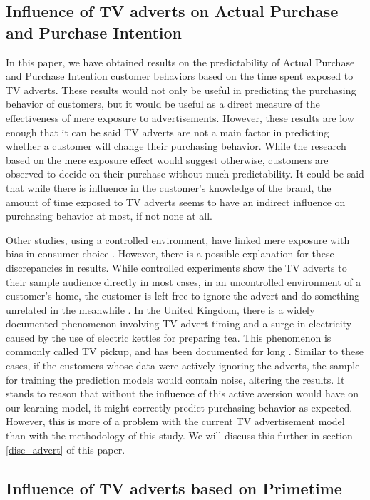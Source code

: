 \documentclass[review]{elsarticle}
\begin{document}
\subsection{Influence of TV adverts on Actual Purchase and Purchase Intention}
\label{disc_ap_pi}

In this paper, we have obtained results on the predictability of Actual Purchase and Purchase Intention customer behaviors based on the time spent exposed to TV adverts. These results would not only be useful in predicting the purchasing behavior of customers, but it would be useful as a direct measure of the effectiveness of mere exposure to advertisements. However, these results are low enough that it can be said TV adverts are not a main factor in predicting whether a customer will change their purchasing behavior. While the research based on the mere exposure effect would suggest otherwise, customers are observed to decide on their purchase without much predictability. It could be said that while there is influence in the customer's knowledge of the brand, the amount of time exposed to TV adverts seems to have an indirect influence on purchasing behavior at most, if not none at all.

Other studies, using a controlled environment, have linked mere exposure with bias in consumer choice \cite{37}. However, there is a possible explanation for these discrepancies in results. While controlled experiments show the TV adverts to their sample audience directly in most cases, in an uncontrolled environment of a customer's home, the customer is left free to ignore the advert and do something unrelated in the meanwhile \cite{38}. In the United Kingdom, there is a widely documented phenomenon involving TV advert timing and a surge in electricity caused by the use of electric kettles for preparing tea. This phenomenon is commonly called TV pickup, and has been documented for long \cite{39,40}. Similar to these cases, if the customers whose data were actively ignoring the adverts, the sample for training the prediction models would contain noise, altering the results. It stands to reason that without the influence of this active aversion would have on our learning model, it might correctly predict purchasing behavior as expected. However, this is more of a problem with the current TV advertisement model than with the methodology of this study. We will discuss this further in section \ref{disc_advert} of this paper.


\subsection{Influence of TV adverts based on Primetime}
\label{disc_prime}
\end{document}
